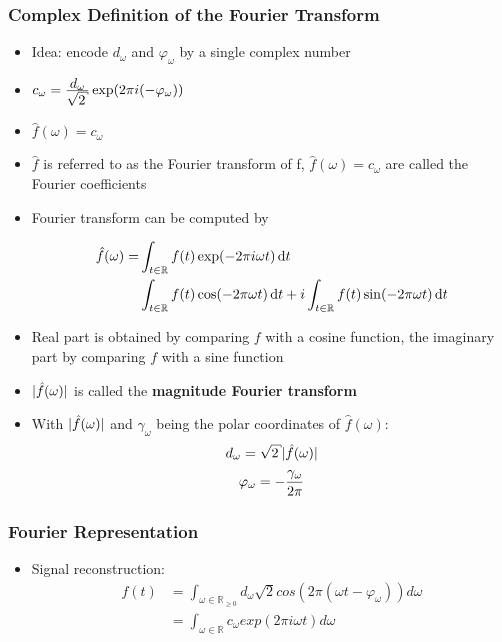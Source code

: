\subsubsection*{Complex Definition of the Fourier Transform}
\begin{itemize}
    \item
        Idea: encode $d_\omega$ and $\varphi_\omega$ by a single complex number
    \item
        $ c_\omega = \ffrac{d_\omega}{\sqrt{2}} \exp(2\pi i(-\varphi_\omega))$
    \item
        $\hat{f}(\omega) = c_\omega$
    \item     
        $\hat{f}$ is referred to as the Fourier transform of f, $\hat{f}(\omega) = c_\omega$ are called the Fourier coefficients
    \item
        Fourier transform can be computed by

        \begin{align*}
            \hat{f}(\omega) = & \int_{t \in \mathbb{R}} f(t) \exp(-2\pi i \omega t) \, \mathrm{d} t\\
            & \int_{t \in \mathbb{R}} f(t) \cos(-2\pi \omega t)  \, \mathrm{d} t + i \int_{t \in \mathbb{R}} f(t) \sin(-2 \pi \omega t) \, \mathrm{d} t
        \end{align*}
    \item
        Real part is obtained by comparing $f$ with a cosine function, the imaginary part by comparing $f$ with a sine function
    \item
        $\lvert\hat{f}(\omega)\rvert$ is called the \textbf{magnitude Fourier transform}
    \item
        With $\lvert\hat{f}(\omega)\rvert$ and $\gamma_\omega$ being the polar coordinates of $\hat{f}(\omega)$:
        $$d_\omega = \sqrt{2} \abs{\hat{f}(\omega)}$$
        $$\varphi_\omega = -\frac{\displaystyle \gamma_\omega}{\displaystyle 2\pi}$$
\end{itemize}
\subsubsection*{Fourier Representation}
\begin{itemize}
    \item
        Signal reconstruction:
        \begin{align*}
            f(t) & = \int_{\omega \in \mathbb{R}_{\geq 0}} d_\omega \sqrt{2} cos(2 \pi (\omega t - \varphi_\omega))d\omega\\
            & = \int_{\omega \in \mathbb{R}} c_\omega exp(2\pi i \omega t)d \omega
        \end{align*}
        
\end{itemize}
